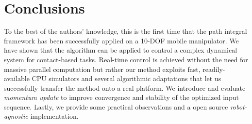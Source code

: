 \section{Conclusions} \label{sec:conclusions}
To the best of the authors' knowledge, this is the first time that the path integral framework has been successfully applied on a 10-DOF mobile manipulator. We have shown that the algorithm can be applied to control a complex dynamical system for contact-based tasks. Real-time control is achieved without the need for massive parallel computation but rather our method exploits fast, readily-available CPU simulators and several algorithmic adaptations that let us successfully transfer the method onto a real platform. We introduce and evaluate \textit{momentum update} to improve convergence and stability of the optimized input sequence. Lastly, we provide some practical observations and a open source \textit{robot-agnostic} implementation. 
